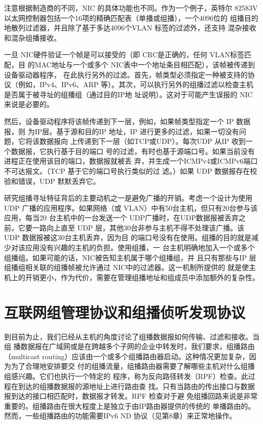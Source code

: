 注意根据制造商的不同，NIC 的具体功能也不同。作为一个例子，英特尔
82583V以太网控制器包括一个16项的精确匹配表（单播或组播），一个4096位的
组播目的地散列过滤器，并且除了基于多达4096个VLAN 标签的过滤外，还支持
混杂接收和混杂组播接收。

一旦 NIC硬件验证一个帧是可以接受的（即 CRC是正确的，任何 VLAN标签匹配，目
的MAC地址与一个或多个 NIC表中一个地址条目相匹配），该帧被传递到设备驱动器程序，
在此执行另外的过滤。首先，帧类型必须指定一种被支持的协议（例如，IPv4、IPv6、ARP
等）。其次，可以执行另外的组播过滤以检查主机是否属于被寻址的组播组（通过目的IP地
址说明）。这对于可能产生误报的 NIC来说是必要的。

然后，设备驱动程序将该帧传递到下一层，例如，如果帧类型指定一个 IP 数据报，则
为IP层。基于源和目的IP 地址，IP 进行更多的过滤，如果一切没有问题，它将该数据报向
上传递到下一层（如TCP或UDP）。每次UDP 从IP 收到一个数据报，它执行基于目的端口
号的过滤，有时也基于源端口号。如果当前没有进程正在使用该目的端口，数据报就被丢
弃，并生成一个ICMPv4或ICMPv6端口不可达报文。（TCP 基于它的端口号执行类似的过
滤。）如果 UDP 数据报存在校验和错误，UDP 默默丢弃它。

研究组播寻址特征背后的主要动机之一是避免广播的开销。考虑一个设计为使用UDP
广播的应用程序。如果网络（或 VLAN）中有50台主机，但只有20台参与该应用，每当20
台主机中的一台发送一个 UDP广播时，在UDP数据报被丢弃之前，它要一路向上直至 UDP
层，其他30台非参与主机不得不处理该广播。该UDP 数据报被这30台主机丢弃，因为目
的端口号没有在使用。组播的目的就是减少对该应用没有兴趣的主机的负担。使用组播，一
台主机明确地加入一个或多个组播组。如果可能的话，NIC被告知主机属于哪个组播组，并
且只有那些与IP 层组播组相关联的组播帧被允许通过 NIC中的过滤器。这一机制所提供的
就是使主机上的开销更小，作为代价，需要在管理组播地址和组成员中添加额外的复杂性。

\section{互联网组管理协议和组播侦听发现协议}

到目前为止，我们已经从主机的角度讨论了组播数据报如何传输、过滤和接收。当组
播数据报在广域网或是在跨越多个子网的企业中转发时，我们要求，组播路由（multicast
routing）应该由一个或多个组播路由器启动。这种情况更加复杂，因为为了合理地安排要交
付的组播流量，组播路由器需要了解哪些主机对什么组播组感兴趣。它们也执行一个特定的
程序，称为反向路径转发（RPF）检查。此过程在到达的组播数据报的源地址上进行路由查
找。只有当路由的传出接口与数据报到达的接口相匹配时，数据报才转发。RPF 检查对于避
免组播回路来说是非常重要的。组播路由在很大程度上是独立于由IP路由器提供的传统的
单播路由的。然而，一些组播路由的功能需要IPv6 ND 协议（见第8章）来正常地操作。

